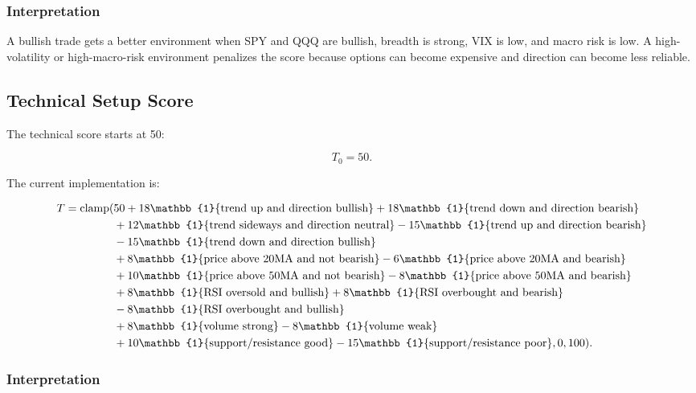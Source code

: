 \documentclass[11pt]{article}
\newcommand{\indicator}[1]{\mathbb{1}\{#1\}}
\newcommand{\clamp}{\operatorname{clamp}}
\begin{document}
\subsubsection{Interpretation}

A bullish trade gets a better environment when SPY and QQQ are bullish, breadth is strong, VIX is low, and macro risk is low. A high-volatility or high-macro-risk environment penalizes the score because options can become expensive and direction can become less reliable.

\subsection{Technical Setup Score}

The technical score starts at 50:

\begin{equation}
T_0 = 50.
\end{equation}

The current implementation is:

\begin{align}
T = \clamp(&50
 + 18\indicator{\text{trend up and direction bullish}}
 + 18\indicator{\text{trend down and direction bearish}} \notag \\
&+ 12\indicator{\text{trend sideways and direction neutral}}
 - 15\indicator{\text{trend up and direction bearish}} \notag \\
&- 15\indicator{\text{trend down and direction bullish}} \notag \\
&+ 8\indicator{\text{price above 20MA and not bearish}}
 - 6\indicator{\text{price above 20MA and bearish}} \notag \\
&+ 10\indicator{\text{price above 50MA and not bearish}}
 - 8\indicator{\text{price above 50MA and bearish}} \notag \\
&+ 8\indicator{\text{RSI oversold and bullish}}
 + 8\indicator{\text{RSI overbought and bearish}} \notag \\
&- 8\indicator{\text{RSI overbought and bullish}} \notag \\
&+ 8\indicator{\text{volume strong}}
 - 8\indicator{\text{volume weak}} \notag \\
&+ 10\indicator{\text{support/resistance good}}
 - 15\indicator{\text{support/resistance poor}},
0,100).
\end{align}

\subsubsection{Interpretation}
\end{document}
